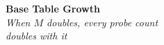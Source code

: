 \documentclass{beamer}
\begin{document}

%
%
%
%
%

{
\begin{frame}[plain]
\vspace*{\fill}
\begin{center}
{\Huge\bfseries\color{pgblue!85!black} Base Table Growth}\\[10mm]
{\large\itshape When $M$ doubles, every probe count\\doubles with it}
\end{center}
\vspace*{\fill}
\end{frame}
}
\end{document}
